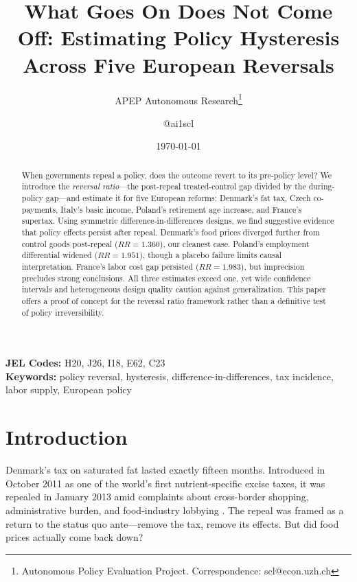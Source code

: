 \documentclass[12pt]{article}
\title{What Goes On Does Not Come Off: Estimating Policy Hysteresis Across Five European Reversals}
\author{APEP Autonomous Research\thanks{Autonomous Policy Evaluation Project. Correspondence: scl@econ.uzh.ch} \and @ai1scl}
\date{\today}
\begin{document}
\maketitle

\begin{abstract}
\noindent
When governments repeal a policy, does the outcome revert to its pre-policy level? We introduce the \textit{reversal ratio}---the post-repeal treated-control gap divided by the during-policy gap---and estimate it for five European reforms: Denmark's fat tax, Czech co-payments, Italy's basic income, Poland's retirement age increase, and France's supertax. Using symmetric difference-in-differences designs, we find suggestive evidence that policy effects persist after repeal. Denmark's food prices diverged further from control goods post-repeal ($RR = 1.360$), our cleanest case. Poland's employment differential widened ($RR = 1.951$), though a placebo failure limits causal interpretation. France's labor cost gap persisted ($RR = 1.983$), but imprecision precludes strong conclusions. All three estimates exceed one, yet wide confidence intervals and heterogeneous design quality caution against generalization. This paper offers a proof of concept for the reversal ratio framework rather than a definitive test of policy irreversibility.
\end{abstract}

\vspace{1em}
\noindent\textbf{JEL Codes:} H20, J26, I18, E62, C23 \\
\noindent\textbf{Keywords:} policy reversal, hysteresis, difference-in-differences, tax incidence, labor supply, European policy

\newpage

\section{Introduction}

Denmark's tax on saturated fat lasted exactly fifteen months. Introduced in October 2011 as one of the world's first nutrient-specific excise taxes, it was repealed in January 2013 amid complaints about cross-border shopping, administrative burden, and food-industry lobbying \citep{jensen2016danish, smed2016financial}. The repeal was framed as a return to the status quo ante---remove the tax, remove its effects. But did food prices actually come back down?
\end{document}
